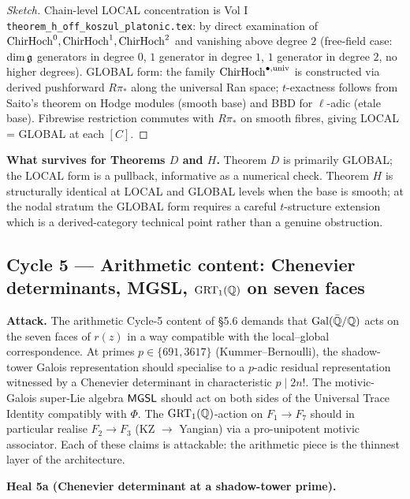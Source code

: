 \begin{proof}[Sketch]
Chain-level LOCAL concentration is Vol I
\texttt{theorem\_h\_off\_koszul\_platonic.tex}: by direct examination
of $\mathrm{ChirHoch}^0, \mathrm{ChirHoch}^1, \mathrm{ChirHoch}^2$ and vanishing above degree
$2$ (free-field case: $\dim \mathfrak{g}$ generators in degree $0$, $1$
generator in degree $1$, $1$ generator in degree $2$, no higher
degrees). GLOBAL form: the family $\mathrm{ChirHoch}^{\bullet, \mathrm{univ}}$
is constructed via derived pushforward $R\pi_*$ along the universal
Ran space; $t$-exactness follows from Saito's theorem on Hodge modules
(smooth base) and BBD for $\ell$-adic (etale base). Fibrewise
restriction commutes with $R\pi_*$ on smooth fibres, giving
LOCAL = GLOBAL at each $[C]$.
\end{proof}

\textbf{What survives for Theorems $D$ and $H$.} Theorem $D$ is
primarily GLOBAL; the LOCAL form is a pullback, informative as a
numerical check. Theorem $H$ is structurally identical at LOCAL and
GLOBAL levels when the base is smooth; at the nodal stratum the
GLOBAL form requires a careful $t$-structure extension which is a
derived-category technical point rather than a genuine obstruction.

\subsection*{Cycle 5 --- Arithmetic content: Chenevier determinants,
MGSL, $\mathrm{GRT}_1(\mathbb{Q})$ on seven faces}

\textbf{Attack.} The arithmetic Cycle-5 content of §5.6 demands that
$\mathrm{Gal}(\bar{\mathbb{Q}} / \mathbb{Q})$ acts on the seven faces of $r(z)$ in a way
compatible with the local--global correspondence. At primes
$p \in \{691, 3617\}$ (Kummer--Bernoulli), the shadow-tower Galois
representation should specialise to a $p$-adic residual representation
witnessed by a Chenevier determinant in characteristic $p \mid 2n!$.
The motivic-Galois super-Lie algebra $\mathsf{MGSL}$ should act on both sides
of the Universal Trace Identity compatibly with $\Phi$. The
$\mathrm{GRT}_1(\mathbb{Q})$-action on $F_1 \to F_7$ should in particular realise
$F_2 \to F_3$ (KZ $\to$ Yangian) via a pro-unipotent motivic
associator. Each of these claims is attackable: the arithmetic piece
is the thinnest layer of the architecture.

\textbf{Heal 5a (Chenevier determinant at a shadow-tower prime).}

